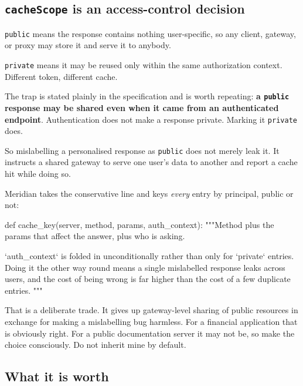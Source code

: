 \subsection{\texttt{cacheScope} is an access-control decision}


\texttt{public} means the response contains nothing user-specific, so any
client, gateway, or proxy may store it and serve it to anybody.

\texttt{private} means it may be reused only within the same authorization
context. Different token, different cache.

The trap is stated plainly in the specification and is worth repeating:
\textbf{a \texttt{public} response may be shared even when it came from an
authenticated endpoint}. Authentication does not make a response private.
Marking it \texttt{private} does.

So mislabelling a personalised response as \texttt{public} does not merely leak
it. It instructs a shared gateway to serve one user's data to another and report
a cache hit while doing so.

Meridian takes the conservative line and keys \emph{every} entry by principal,
public or not:

\begin{py}
def cache_key(server, method, params, auth_context):
    """Method plus the params that affect the answer, plus who is asking.

    `auth_context` is folded in unconditionally rather than only for `private`
    entries. Doing it the other way round means a single mislabelled response
    leaks across users, and the cost of being wrong is far higher than the cost
    of a few duplicate entries.
    """
\end{py}

That is a deliberate trade. It gives up gateway-level sharing of public
resources in exchange for making a mislabelling bug harmless. For a financial
application that is obviously right. For a public documentation server it may
not be, so make the choice consciously. Do not inherit mine by default.

\subsection{What it is worth}


